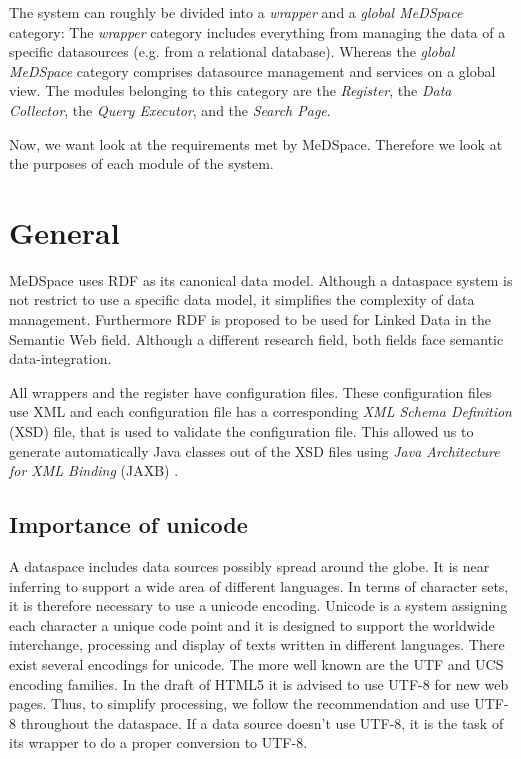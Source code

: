 The system can roughly be divided into a \emph{wrapper} and a \emph{global MeDSpace} category: The \emph{wrapper} category includes everything from managing the data of a specific datasources (e.g. from a relational database). 
Whereas the \emph{global MeDSpace} category comprises datasource management and services on a global view.  The modules belonging to this category are the \emph{Register}, the \emph{Data Collector}, the \emph{Query Executor}, and the \emph{Search Page}.  

Now, we want look at the requirements met by MeDSpace. Therefore we look at the purposes of each module of the system.

\section{General} 
MeDSpace uses RDF \cite{w3RDF} as its canonical data model. Although a dataspace system is not restrict to use a specific data model, it simplifies the complexity of data management.
Furthermore RDF is proposed to be used for Linked Data \cite{LinkedData} in the Semantic Web field. Although a different research field, both fields face semantic data-integration.

All wrappers and the register have configuration files. These configuration files use XML and each configuration file has a corresponding \emph{XML Schema Definition} (XSD)\cite{w3XMLSchema} file, that is used to validate the configuration file. This allowed us to generate automatically Java classes out of the XSD files using \emph{Java Architecture for XML Binding} (JAXB) \cite{JAXB}.


\subsection{Importance of unicode}

A dataspace includes data sources possibly spread around the globe. It is near inferring to support a wide area of different languages. In terms of character sets, it is therefore necessary to use a unicode encoding.
Unicode is a system assigning each character a unique code point and it is designed to support the worldwide interchange, processing and display of texts written in different languages\cite{UnicodeStandard}.\newline
There exist several encodings for unicode. The more well known are the UTF and UCS encoding families. In the draft of HTML5 it is advised to use UTF-8 for new web pages\cite{HTML5Rec}. 
Thus, to simplify processing, we follow the recommendation and use UTF-8 throughout the dataspace. If a data source doesn't use UTF-8, it is the task of its wrapper to do a proper conversion to UTF-8.

